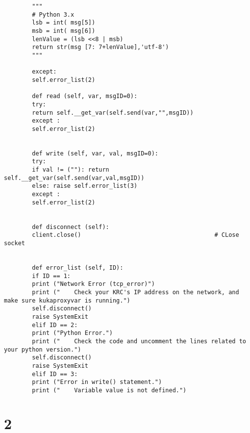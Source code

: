 \documentclass{book}
\begin{document}
\begin{verbatim}
		"""
		# Python 3.x
		lsb = int( msg[5])
		msb = int( msg[6])
		lenValue = (lsb <<8 | msb)
		return str(msg [7: 7+lenValue],'utf-8')  
		"""
		
		except:
		self.error_list(2)
		
		def read (self, var, msgID=0):
		try:
		return self.__get_var(self.send(var,"",msgID))  
		except :
		self.error_list(2)
		
		
		def write (self, var, val, msgID=0):
		try:
		if val != (""): return self.__get_var(self.send(var,val,msgID))
		else: raise self.error_list(3)
		except :
		self.error_list(2)
		
		
		def disconnect (self):
		client.close()                                      # CLose socket
		
		
		def error_list (self, ID):
		if ID == 1:
		print ("Network Error (tcp_error)")
		print ("    Check your KRC's IP address on the network, and make sure kukaproxyvar is running.")
		self.disconnect()
		raise SystemExit
		elif ID == 2:
		print ("Python Error.")
		print ("    Check the code and uncomment the lines related to your python version.")
		self.disconnect()
		raise SystemExit
		elif ID == 3:
		print ("Error in write() statement.")
		print ("    Variable value is not defined.")
	\end{verbatim}


	\newpage
	\section{2}
	
\end{document}
